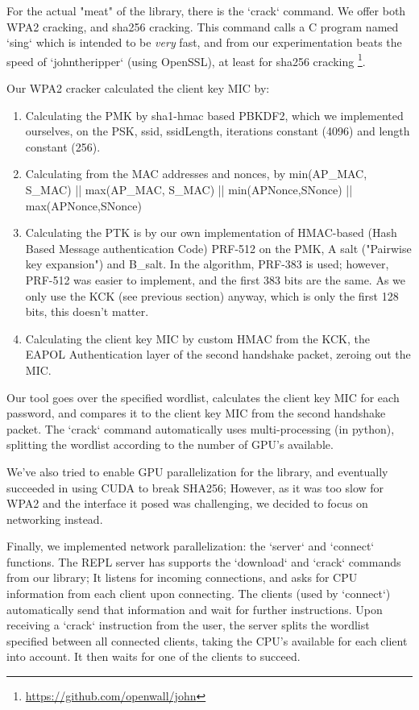 \documentclass[sigconf]{acmart}
\begin{document}
For the actual "meat" of the library, there is the `crack` command. We offer both WPA2 cracking, and sha256 cracking. This command calls a C program named `sing` which is intended to be \textit{very} fast, and from our experimentation beats the speed of `johntheripper` (using OpenSSL), at least for sha256 cracking \footnote{\hyperlink{https://github.com/openwall/john}{https://github.com/openwall/john}}.

Our WPA2 cracker calculated the client key MIC by:
\begin{enumerate}
\item  Calculating the PMK by sha1-hmac based PBKDF2, which we implemented ourselves, on the PSK, ssid, ssidLength, iterations constant (4096) and length constant (256).
\item  Calculating from the MAC addresses and nonces, by min(AP\_MAC, S\_MAC) || max(AP\_MAC, S\_MAC) || min(APNonce,SNonce) || max(APNonce,SNonce)
\item Calculating the PTK is by our own implementation of HMAC-based (Hash Based Message authentication Code) PRF-512 on the PMK, A salt ("Pairwise key expansion") and B\_salt. In the algorithm, PRF-383 is used; however, PRF-512 was easier to implement, and the first 383 bits are the same. As we only use the KCK (see previous section) anyway, which is only the first 128 bits, this doesn't matter.
\item Calculating the client key MIC by custom HMAC from the KCK, the EAPOL Authentication layer of the second handshake packet, zeroing out the MIC.
\end{enumerate}

Our tool goes over the specified wordlist, calculates the client key MIC for each password, and compares it to the client key MIC from the second handshake packet. The `crack` command automatically uses multi-processing (in python), splitting the wordlist according to the number of GPU's available.

We've also tried to enable GPU parallelization for the library, and eventually succeeded in using CUDA to break SHA256; However, as it was too slow for WPA2 and the interface it posed was challenging, we decided to focus on networking instead.

Finally, we implemented network parallelization: the `server` and `connect` functions. The REPL server has supports the `download` and `crack` commands from our library; It listens for incoming connections, and asks for CPU information from each client upon connecting. The clients (used by `connect`) automatically send that information and wait for further instructions. Upon receiving a `crack` instruction from the user, the server splits the wordlist specified between all connected clients, taking the CPU's available for each client into account. It then waits for one of the clients to succeed.
\end{document}
